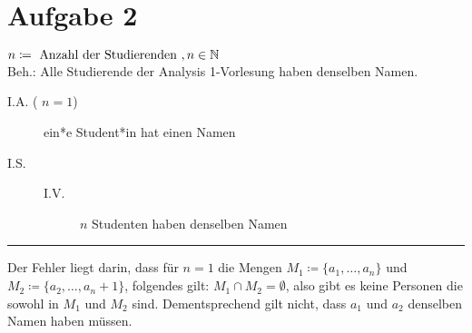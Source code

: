 \documentclass{gadsescript}
\begin{document}
\maketitle
\section*{Aufgabe 2}
$ n \coloneqq \text{ Anzahl der Studierenden }, n \in \mathbb{N} $\\
Beh.: Alle Studierende der Analysis 1-Vorlesung haben denselben Namen.\\
\begin{description}
	\item[I.A. ( $ n = 1 $)] ein*e Student*in hat einen Namen
	\item[I.S.]
		\begin{description}
			\item[I.V.] $ n $ Studenten haben denselben Namen
		\end{description}
		
\end{description}

\noindent\rule{\textwidth}{0.4pt}

Der Fehler liegt darin, dass für $ n = 1 $ die Mengen $ M_1 \coloneqq \{ a_1, \dotsc, a_n \} $ und $ M_2 \coloneqq \{ a_2, \dotsc, a_n+1 \} $, folgendes gilt: $M_1 \cap M_2 = \emptyset$, also gibt es keine Personen die sowohl in $ M_1 $ und $ M_2 $ sind. Dementsprechend gilt nicht, dass $ a_1 $ und $ a_2 $ denselben Namen haben müssen.
\end{document}
